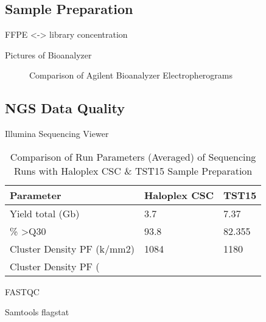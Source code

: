 \subsection{Sample Preparation}
FFPE <-> library concentration

Pictures of Bioanalyzer

\begin{figure}[!tbp]
  \centering
  \hfill
  \caption{Comparison of Agilent Bioanalyzer Electropherograms}
\end{figure}

\subsection{NGS Data Quality}

Illumina Sequencing Viewer

\begin{table}[!htbp]
    \caption[ISV]{Comparison of Run Parameters (Averaged) of Sequencing Runs with Haloplex CSC \& TST15 Sample Preparation}
    \centering
    \begin{tabular}{ |p{4cm}||p{4cm}||p{4cm}|}
    \hline
    Parameter & Haloplex CSC & TST15 \\ \hline \hline
    Yield total (Gb) & 3.7 & 7.37 \\ \hline
    \% \textgreater Q30 & 93.8 & 82.355 \\ \hline
    Cluster Density PF (k/mm2) & 1084 & 1180  \\ \hline
    Cluster Density PF (%
  \end{tabular}
\end{table}

FASTQC

Samtools flagstat

